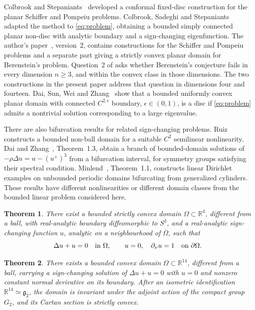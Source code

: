 \documentclass[11pt]{amsart}
\newtheorem{theorem}{Theorem}[section]
\theoremstyle{remark}
\numberwithin{equation}{section}
\newcommand{\R}{\mathbb R}
\begin{document}
Colbrook and Stepaniants~\cite{ColbrookStepaniants2026} developed a
conformal fixed-disc construction for the planar Schiffer and Pompeiu
problems. Colbrook, Sadeghi and Stepaniants~\cite{CSS2026} adapted the
method to \eqref{eq:problem}, obtaining a bounded simply connected
planar non-disc with analytic boundary and a sign-changing eigenfunction.
The author's paper~\cite{Guo2026}, version~2, contains constructions for
the Schiffer and Pompeiu problems and a separate part giving a strictly
convex planar domain for Berenstein's problem. Question~2 of \cite{Guo2026} asks whether Berenstein's conjecture fails in every dimension $n\ge3$, and within the convex class in those dimensions.
The two constructions in the present paper address that question in
dimensions four and fourteen.
Dai, Sun, Wei and Zhang~\cite{DaiSunWeiZhang2026} show that a bounded uniformly convex planar domain with connected $C^{2,\epsilon}$ boundary, $\epsilon\in(0,1)$, is a disc if \eqref{eq:problem} admits a nontrivial solution corresponding to a large eigenvalue.

There are also bifurcation results for related sign-changing problems.
Ruiz~\cite{Ruiz2025} constructs a bounded non-ball domain for a suitable
$C^2$ semilinear nonlinearity. Dai and Zhang~\cite{DaiZhang2025},
Theorem~1.3, obtain a branch of bounded-domain solutions of
$-\rho\Delta u=u-(u^+)^3$ from a bifurcation interval, for symmetry groups
satisfying their spectral condition. Minlend~\cite{Minlend2023},
Theorem~1.1, constructs linear Dirichlet examples on unbounded periodic
domains bifurcating from generalized cylinders. These results have
different nonlinearities or different domain classes from the bounded
linear problem considered here.

\begin{theorem}\label{thm:r4}
There exist a bounded strictly convex domain $\Omega\subset\R^4$,
different from a ball, with real-analytic boundary diffeomorphic to $S^3$,
and a real-analytic sign-changing function $u$, analytic on a
neighbourhood of $\overline\Omega$, such that
\[
 \Delta u+u=0\quad\hbox{in }\Omega,\qquad
 u=0,\quad\partial_\nu u=1\quad\hbox{on }\partial\Omega.
\]
\end{theorem}

\begin{theorem}\label{thm:r14}
There exists a bounded convex domain $\Omega\subset\R^{14}$, different
from a ball, carrying a sign-changing solution of
$\Delta u+u=0$ with $u=0$ and nonzero constant normal derivative on its
boundary. After an isometric identification $\R^{14}\simeq\mathfrak g_2$,
the domain is invariant under the adjoint action of the compact group
$G_2$, and its Cartan section is strictly convex.
\end{theorem}
\end{document}
